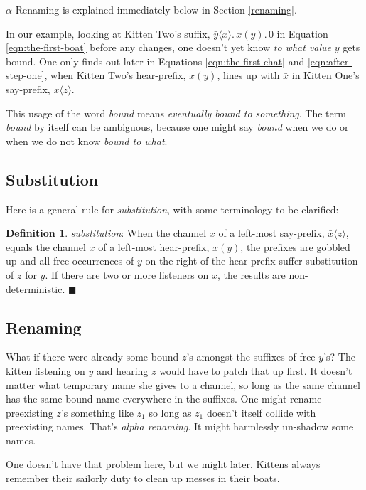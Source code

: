 \documentclass[10pt,oneside,x11names]{article}
\newcommand\napping    [0]{0}
\newcommand\chatting   [3]{\bar{#1}\langle{#2}\rangle{}.\,#3}
\newcommand\listening  [3]{#1(#2).\,#3}
\newcommand{\kitTwoSuffixx}{\chatting{y}{x}{\listening{x}{y}{\napping}}}
\theoremstyle{definition}
\newtheorem{definition}{Definition}
\theoremstyle{warning}
\begin{document}
\(\alpha\)\nobreakdash-Renaming is explained immediately below in
Section \ref{renaming}.

In our example, looking at Kitten Two's suffix, \(\kitTwoSuffixx\)
in Equation \ref{eqn:the-first-boat} before any changes, one
doesn't yet know \emph{to what value} \(y\) gets bound. One only finds
out later in Equations \ref{eqn:the-first-chat} and
\ref{eqn:after-step-one}, when Kitten Two's hear-prefix, \(x(y)\),
lines up with \(\bar{x}\) in Kitten One's say-prefix,
\(\bar{x}\langle{z}\rangle\).

This usage of the word
\emph{bound} means \emph{eventually bound to something}. The term
\emph{bound} by itself can be ambiguous, because one might say
\emph{bound} when we do or when we do not know \emph{bound to what}.

\subsection{Substitution}
\label{sec:orgc529612}

Here is a general rule for \emph{substitution}, with some
terminology to be clarified:

\label{def:substitution}
\begin{definition}{\emph{substitution}:}
  When the channel $x$ of a left-most say-prefix, $\bar{x}\langle{z}\rangle$,
  equals the channel $x$ of a left-most hear-prefix, $x(y)$, the prefixes
  are gobbled up and all free occurrences of $y$ on the
  right of the hear-prefix suffer substitution of $z$ for $y$. If there
  are two or more listeners on $x$, the results are non-deterministic.
  $\blacksquare$
\end{definition}

\subsection{Renaming}
\label{sec:org97733f1}
\label{renaming} What if there were already some bound \(z\)'s
amongst the suffixes of free \(y\)'s? The kitten listening on
\(y\) and hearing \(z\) would have to patch that up first. It
doesn't matter what temporary name she gives to a channel, so
long as the same channel has the same bound name everywhere in
the suffixes. One might rename preexisting \(z\)'s something
like \(z_1\) so long as \(z_1\) doesn't itself collide with
preexisting names. That's \emph{alpha renaming}. It might
harmlessly un-shadow some names.

One doesn't have that problem here, but we might later.
Kittens always remember their sailorly duty to clean up messes
in their boats.
\end{document}

